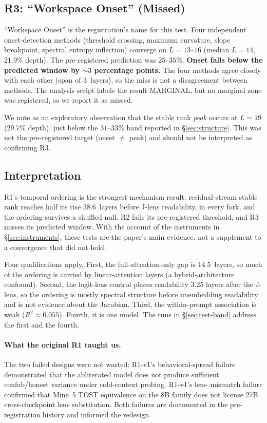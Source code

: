 \documentclass[11pt,a4paper]{article}
\begin{document}
\subsection{R3: ``Workspace Onset'' (Missed)}

``Workspace Onset'' is the registration's name for this test. Four
independent onset-detection methods (threshold crossing, maximum
curvature, slope breakpoint, spectral entropy inflection) converge on
$L{=}13$--$16$ (median $L{=}14$, $21.9\%$ depth). The pre-registered
prediction was $25$--$35\%$. \textbf{Onset falls below the predicted
window by ${\sim}3$ percentage points.} The four methods agree closely
with each other (span of 3~layers), so the miss is not a disagreement
between methods. The analysis script labels the result MARGINAL, but no
marginal zone was registered, so we report it as missed.

We note as an exploratory observation that the stable rank \emph{peak}
occurs at $L{=}19$ ($29.7\%$ depth), just below the $31$--$33\%$ band
reported in \S\ref{sec:structure}. This was not the pre-registered target
(onset $\neq$ peak) and should not be interpreted as confirming R3.

\subsection{Interpretation}

R1's temporal ordering is the strongest mechanism result:
residual-stream stable rank reaches half its rise 38.6~layers before
J-lens readability, in every fork, and the ordering survives a shuffled
null. R2 fails its pre-registered threshold, and R3 misses its predicted
window. With the account of the instruments in \S\ref{sec:instruments},
these tests are the paper's main evidence, not a supplement to a
convergence that did not hold.

Four qualifications apply. First, the full-attention-only gap is
14.5~layers, so much of the ordering is carried by linear-attention
layers (a hybrid-architecture confound). Second, the logit-lens control
places readability $3.25$ layers after the J-lens, so the ordering is
mostly spectral structure before unembedding readability and is not
evidence about the Jacobian. Third, the within-prompt association is
weak ($R^2 \approx 0.055$). Fourth, it is one model. The runs in
\S\ref{sec:test-band} address the first and the fourth.

\paragraph{What the original R1 taught us.} The two failed designs were
not wasted: R1-v1's behavioral-spread failure demonstrated that the
abliterated model does not produce sufficient confab/honest variance
under cold-context probing. R1-v1's lens--mismatch failure confirmed
that Mine~5 TOST equivalence on the 8B family does not license 27B
cross-checkpoint lens substitution. Both failures are documented in the
pre-registration history and informed the redesign.
\end{document}
